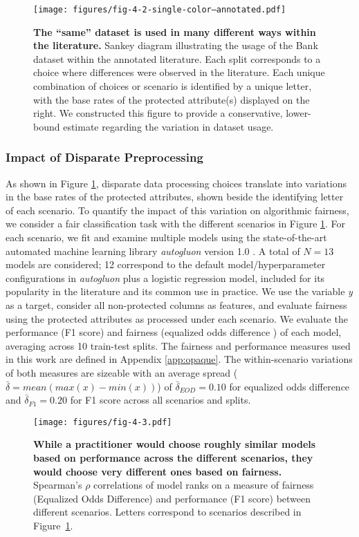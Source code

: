 \begin{figure}    \texttt{[image: figures/fig-4-2-single-color--annotated.pdf]} 
    \caption{\textbf{The ``same'' dataset is used in many different ways within the literature.} Sankey diagram illustrating the usage of the Bank dataset within the annotated literature. Each split corresponds to a choice where differences were observed in the literature. Each unique combination of choices or scenario is identified by a unique letter, with the base rates of the protected attribute(s) displayed on the right. We constructed this figure to provide a conservative, lower-bound estimate regarding the variation in dataset usage.}    \label{fig:sankey}\end{figure} 

\subsubsection*{Impact of Disparate Preprocessing}

As shown in Figure \ref{fig:sankey}, disparate data processing choices translate into variations in the base rates of the protected attributes, shown beside the identifying letter of each scenario. To quantify the impact of this variation on algorithmic fairness, we consider a fair classification task with the different scenarios in Figure \ref{fig:sankey}. For each scenario, we fit and examine multiple models using the state-of-the-art automated machine learning library \emph{autogluon} version 1.0 \citep{agtabular,gijsbers2023amlb,autogluonbenchmark}. A total of $N = 13$ models are considered; 12 correspond to the default model/hyperparameter configurations in \emph{autogluon} plus a logistic regression model, included for its popularity in the literature and its common use in practice. We use the variable \textit{y} as a target, consider all non-protected columns as features, and evaluate fairness using the protected attributes as processed under each scenario. We evaluate the performance (F1 score) and fairness (equalized odds difference \citep{hardt2016equality}) of each model, averaging across 10 train-test splits. The fairness and performance measures used in this work are defined in Appendix \ref{app:opaque}. The within-scenario variations of both measures are sizeable with an average spread ($\bar{\delta} = mean(max(x) - min(x))$) of $\bar{\delta}_{EOD} = 0.10$ for equalized odds difference and $\bar{\delta}_{F1} = 0.20$ for F1 score across all scenarios and splits. 

\begin{figure}    \texttt{[image: figures/fig-4-3.pdf]} 
    \caption{\textbf{While a practitioner would choose roughly similar models based on performance across the different scenarios, they would choose very different ones based on fairness.} Spearman's $\rho$ correlations of model ranks on a measure of fairness (Equalized Odds Difference) and performance (F1 score) between different scenarios. Letters correspond to scenarios described in Figure~\ref{fig:sankey}.}    \label{fig:correlations}\end{figure} 

